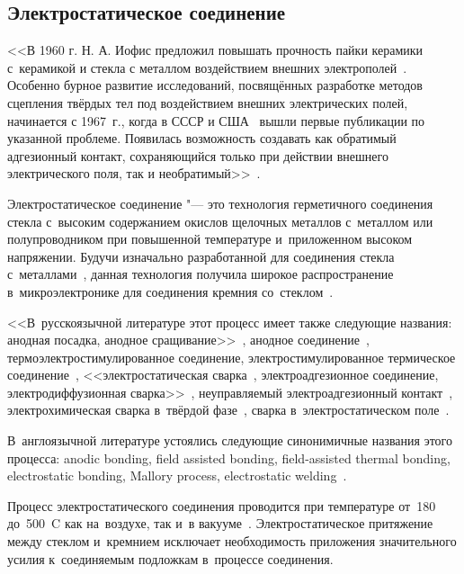 \subsection{Электростатическое соединение}
<<В 1960 г. Н. А. Иофис предложил повышать прочность пайки керамики с~керамикой и стекла с металлом воздействием внешних электрополей~\cite{iofis_patent1960}. Особенно бурное развитие исследований, посвящённых разработке методов сцепления твёрдых тел под воздействием внешних электрических полей, начинается с 1967~г., когда в СССР
и США~\cite{AB_patent_Pomerantz_1968} вышли первые публикации по указанной проблеме. Появилась возможность создавать как обратимый адгезионный контакт, сохраняющийся только при действии внешнего электрического поля, так и необратимый>>~\cite{evdokimov_krestov1988}.

Электростатическое соединение "--- это технология герметичного соединения стекла с~высоким содержанием окислов щелочных металлов с~металлом или полупроводником при повышенной температуре и~приложенном высоком напряжении. Будучи изначально разработанной для соединения стекла с~металлами~\cite{AB_patent_Pomerantz_1968}, данная технология получила широкое распространение в~микроэлектронике для соединения кремния со~стеклом~\cite{New_low_temperature_bonding_tech,lit_Esashi_Wafer2008,ushkov_kozlov2007}.

<<В~русскоязычной литературе этот процесс имеет также следующие названия:
анодная посадка, анодное сращивание>>~\cite{Sinev_technomag2014},
анодное соединение~\cites[122]{Raspopov_micromechanics2007},
термоэлектростимулированное соединение, электростимулированное термическое соединение~\cite{timoshenkov2006issledovanija},
<<электростатическая сварка~\cite{andreev2014kremnievye}, электроадгезионное соединение, электродиффузионная сварка>>~\cite{Sinev_technomag2014},
неуправляемый электроадгезионный контакт~\cite{tonkiy1974eak_avtoref}, электрохимическая сварка в~твёрдой фазе~\cite{khomenko2001proizvodstvo}, сварка в~электростатическом поле~\cite{berezin2001}.

В~англоязычной литературе устоялись следующие синонимичные названия этого процесса: anodic bonding, field assisted bonding, field-assisted thermal bonding, electrostatic bonding, Mallory process, electrostatic welding~\cites[484]{lit_madou2002fundamentals}.

Процесс электростатического соединения проводится при температуре от~180 до~500~{\textdegree}C как на~воздухе, так и~в вакууме~\cites[484]{lit_madou2002fundamentals}. Электростатическое притяжение между стеклом и~кремнием исключает необходимость приложения значительного усилия к~соединяемым подложкам в~процессе соединения.

